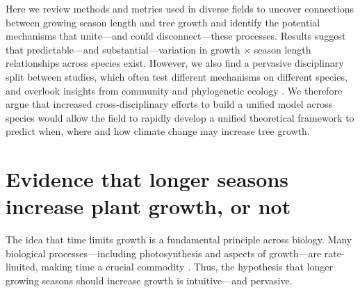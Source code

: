 \documentclass[11pt]{article}
\begin{document}
Here we review methods and metrics used in diverse fields to uncover connections between growing season length and tree growth and identify the potential mechanisms that unite---and could disconnect---these processes. %
Results suggest that predictable---and substantial---variation in growth $\times$ season length relationships across species exist. However, we also find a pervasive disciplinary split between studies, which often test different mechanisms on different species, and overlook insights from community and phylogenetic ecology \citep[e.g.][]{Grime:1977sw,Webb:2002or,avila2023evidence}. We therefore argue that increased cross-disciplinary efforts to build a unified model across species would allow the field to rapidly develop a unified theoretical framework to predict when, where and how climate change may increase tree growth. %

\section*{Evidence that longer seasons increase plant growth, or not}
The idea that time limits growth is a fundamental principle across biology. Many biological processes---including photosynthesis and aspects of growth---are rate-limited, making time a crucial commodity \citep{nobel1983biophysical,cosgrove2005growth,hilty2021plant}. Thus, the hypothesis that longer growing seasons should increase growth is intuitive---and pervasive. 
\end{document}
